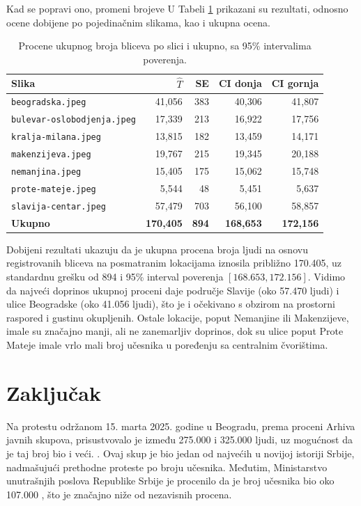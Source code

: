 \documentclass[a4paper,12pt]{article}
\begin{document}
Kad se popravi ono, promeni brojeve 
\newline
\noindent
U Tabeli \ref{tab:results} prikazani su rezultati, odnosno ocene dobijene po pojedinačnim slikama, kao i ukupna ocena.

\begin{table}[H]
\centering
\begin{tabular}{lrrrr}
\hline
Slika & $\hat T$ & SE & CI donja & CI gornja \\
\hline
\texttt{beogradska.jpeg}          & 41,056  & 383 & 40,306  & 41,807  \\
\texttt{bulevar-oslobodjenja.jpeg}& 17,339  & 213 & 16,922  & 17,756  \\
\texttt{kralja-milana.jpeg}       & 13,815  & 182 & 13,459  & 14,171  \\
\texttt{makenzijeva.jpeg}         & 19,767  & 215 & 19,345  & 20,188  \\
\texttt{nemanjina.jpeg}           & 15,405  & 175 & 15,062  & 15,748  \\
\texttt{prote-mateje.jpeg}        & 5,544   & 48  & 5,451   & 5,637   \\
\texttt{slavija-centar.jpeg}      & 57,479  & 703 & 56,100  & 58,857  \\
\hline
\textbf{Ukupno}                   & \textbf{170,405} & \textbf{894} & \textbf{168,653} & \textbf{172,156} \\
\hline
\end{tabular}
\caption{Procene ukupnog broja bliceva po slici i ukupno, sa 95\% intervalima poverenja.}
\label{tab:results}
\end{table}

Dobijeni rezultati ukazuju da je ukupna procena broja ljudi na osnovu registrovanih bliceva na posmatranim lokacijama iznosila približno 170.405, uz standardnu grešku od 894 i 95\% interval poverenja $[168.653, 172.156]$. Vidimo da najveći doprinos ukupnoj proceni daje područje Slavije (oko 57.470 ljudi) i ulice Beogradske (oko 41.056 ljudi), što je i očekivano s obzirom na prostorni raspored i gustinu okupljenih. Ostale lokacije, poput Nemanjine ili Makenzijeve, imale su značajno manji, ali ne zanemarljiv doprinos, dok su ulice poput Prote Mateje imale vrlo mali broj učesnika u poređenju sa centralnim čvorištima.

\newpage
\section{Zaključak}
Na protestu održanom 15. marta 2025. godine u Beogradu, prema proceni Arhiva javnih skupova, prisustvovalo je između 275.000 i 325.000 ljudi, uz mogućnost da je taj broj bio i veći. \cite{n1protest15za15}
. Ovaj skup je bio jedan od najvećih u novijoj istoriji Srbije, nadmašujući prethodne proteste po broju učesnika. Međutim, Ministarstvo unutrašnjih poslova Republike Srbije je procenilo da je broj učesnika bio oko 107.000 \cite{insajder_mup_15za15}, što je značajno niže od nezavisnih procena.
\end{document}
